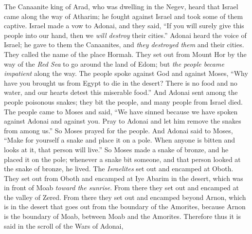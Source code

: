 \begin{biblechapter} %
 The Canaanite king of Arad, who was dwelling in the Negev, heard that Israel came along the way of Atharim; he fought against Israel and took some of them captive.
\verse Israel made a vow to Adonai, and they said, “If you will surely give this people into our hand, then we \textit{will destroy} their cities.”
\verse Adonai heard the voice of Israel; he gave to them the Canaanites, and \textit{they destroyed them} and their cities. They called the name of the place Hormah.
\verse They set out from Mount Hor by the way of the \textit{Red Sea} to go around the land of Edom; but \textit{the people became impatient} along the way.
\verse The people spoke against God and against Moses, “Why have you brought us from Egypt to die in the desert? There is no food and no water, and our hearts detest this miserable food.”
 And Adonai sent among the people poisonous snakes; they bit the people, and many people from Israel died.
\verse The people came to Moses and said, “We have sinned because we have spoken against Adonai and against you. Pray to Adonai and let him remove the snakes from among us.” So Moses prayed for the people.
\verse And Adonai said to Moses, “Make for yourself a snake and place it on a pole. When anyone is bitten and looks at it, that person will live.”
\verse So Moses made a snake of bronze, and he placed it on the pole; whenever a snake bit someone, and that person looked at the snake of bronze, he lived.
\verse The \textit{Israelites} set out and encamped at Oboth.
\verse They set out from Oboth and encamped at Iye Abarim in the desert, which was in front of Moab \textit{toward the sunrise}.
\verse From there they set out and encamped at the valley of Zered.
\verse From there they set out and encamped beyond Arnon, which is in the desert that goes out from the boundary of the Amorites, because Arnon is the boundary of Moab, between Moab and the Amorites.
\verse Therefore thus it is said in the scroll of the Wars of Adonai,

\end{biblechapter}
